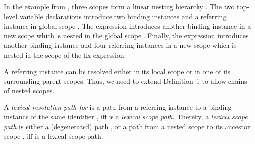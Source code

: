 In the example from ,
  three scopes form a linear nesting hierarchy .
The two top-level variable declarations introduce two binding instances 
and a referring instance 
in global scope .
The  expression introduces another binding instance 
  in a new scope 
  which is nested in the global scope .
Finally, the  expression introduces another binding instance
  and four referring instances 
  in a new scope 
  which is nested in the scope  of the fix expression.
 


A referring instance can be resolved either in its local scope or
  in one of its surrounding parent scopes.
Thus, we need to extend Definition~1 to allow chains of nested scopes.

\begin{definition}
A \emph{lexical resolution path for } is
  a path 
  from a referring instance 
  to a binding instance  
  of the same identifier , 
    iff  is a \emph{lexical scope path}.
Thereby, a \emph{lexical scope path} is either
a (degenerated) path , or 
a path 
  from a nested scope 
  to its ancestor scope , 
    iff  is a lexical scope path.
\end{definition}

